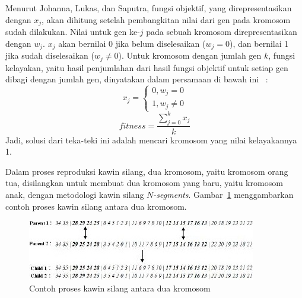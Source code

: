 \documentclass[a4paper,twoside]{article}
\begin{document}
\begin{enumerate}
Menurut Johanna, Lukas, dan Saputra, fungsi objektif, yang direpresentasikan dengan \begin{math}x_j\end{math}, akan dihitung setelah pembangkitan nilai dari gen pada kromosom sudah dilakukan. Nilai untuk gen ke-\begin{math}j\end{math} pada sebuah kromosom direpresentasikan dengan \begin{math}w_j\end{math}. \begin{math}x_j\end{math} akan bernilai 0 jika belum diselesaikan (\begin{math}w_j = 0\end{math}), dan bernilai 1 jika sudah diselesaikan (\begin{math}w_j \neq 0\end{math}). Untuk kromosom dengan jumlah gen \begin{math}k\end{math}, fungsi kelayakan, yaitu hasil penjumlahan dari hasil fungsi objektif untuk setiap gen dibagi dengan jumlah gen, dinyatakan dalam persamaan di bawah ini ~\cite{JohannaLukasSaputra}:
\begin{displaymath}
x_j =
\begin{cases}
0, w_j = 0 \\
1, w_j \neq 0
\end{cases}
\end{displaymath}
\begin{displaymath}
fitness = \frac{\sum_{j=0}^k x_j}{k}
\end{displaymath}
Jadi, solusi dari teka-teki ini adalah mencari kromosom yang nilai kelayakannya 1.

Dalam proses reproduksi kawin silang, dua kromosom, yaitu kromosom orang tua, disilangkan untuk membuat dua kromosom yang baru, yaitu kromosom anak, dengan metodologi kawin silang \textit{\begin{math}N\end{math}-segments}. Gambar~\ref{fig:hybrid9} menggambarkan contoh proses kawin silang antara dua kromosom.

\begin{figure}
\centering
\captionsetup{justification=centering}
\includegraphics[scale=1]{Gambar/HybridGenetic9}
\caption[Contoh proses kawin silang antara dua kromosom ~\cite{JohannaLukasSaputra}]{Contoh proses kawin silang antara dua kromosom ~\cite{JohannaLukasSaputra}}
\label{fig:hybrid9}
\end{figure}


\end{enumerate}
\end{document}
